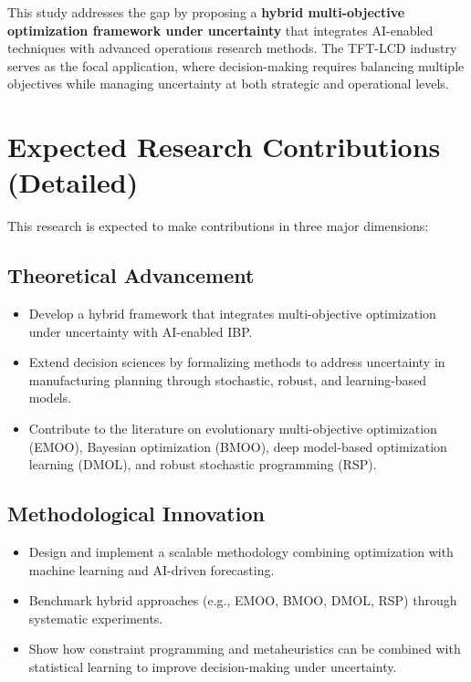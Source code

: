 \documentclass[12pt,a4paper]{article}
\begin{document}
This study addresses the gap by proposing a \textbf{hybrid multi-objective optimization framework under uncertainty} that integrates AI-enabled techniques with advanced operations research methods. The TFT-LCD industry serves as the focal application, where decision-making requires balancing multiple objectives while managing uncertainty at both strategic and operational levels.

\section{Expected Research Contributions (Detailed)}

This research is expected to make contributions in three major dimensions:

\subsection{Theoretical Advancement}

\begin{itemize}[leftmargin=*]
    \item Develop a hybrid framework that integrates multi-objective optimization under uncertainty with AI-enabled IBP.
    
    \item Extend decision sciences by formalizing methods to address uncertainty in manufacturing planning through stochastic, robust, and learning-based models.
    
    \item Contribute to the literature on evolutionary multi-objective optimization (EMOO), Bayesian optimization (BMOO), deep model-based optimization learning (DMOL), and robust stochastic programming (RSP).
\end{itemize}

\subsection{Methodological Innovation}

\begin{itemize}[leftmargin=*]
    \item Design and implement a scalable methodology combining optimization with machine learning and AI-driven forecasting.
    
    \item Benchmark hybrid approaches (e.g., EMOO, BMOO, DMOL, RSP) through systematic experiments.
    
    \item Show how constraint programming and metaheuristics can be combined with statistical learning to improve decision-making under uncertainty.
\end{itemize}
\end{document}
